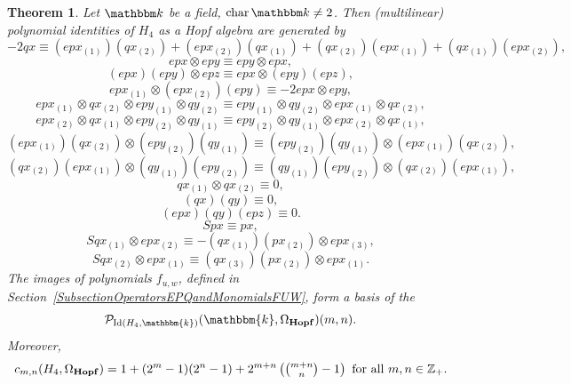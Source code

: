 \documentclass[12pt, reqno, a4paper]{amsart}
\theoremstyle{plain}
\newtheorem{theorem}{Theorem}[section]
\theoremstyle{remark}
\theoremstyle{definition}
\numberwithin{equation}{section}
\DeclareMathOperator{\Id}{Id}
\DeclareMathOperator{\ch}{char}
\begin{document}
\begin{theorem} Let $\mathbbm k$ be a field, $\ch \mathbbm k \ne 2$. Then (multilinear) polynomial identities of $H_4$ as a Hopf algebra are generated by
\begin{equation}\label{EqSweedlerIdFirst}
-2qx \equiv (epx_{(1)})(qx_{(2)})+(epx_{(2)})(qx_{(1)})+(qx_{(2)})(epx_{(1)})+(qx_{(1)})(epx_{(2)}),
\end{equation}
\begin{equation}\label{EqSweedlerIdRearrangeFirst}epx\otimes epy \equiv epy \otimes epx,
\end{equation}
\begin{equation}(epx)(epy)\otimes epz \equiv epx \otimes (epy)(epz),
\end{equation}
\begin{equation}epx_{(1)}\otimes (epx_{(2)})(epy) \equiv -2 epx \otimes epy,
\end{equation}
\begin{equation} epx_{(1)} \otimes qx_{(2)} \otimes epy_{(1)} \otimes qy_{(2)}
\equiv epy_{(1)} \otimes qy_{(2)} \otimes epx_{(1)} \otimes qx_{(2)},
\end{equation}
\begin{equation} epx_{(2)} \otimes qx_{(1)} \otimes epy_{(2)} \otimes qy_{(1)}
\equiv epy_{(2)} \otimes qy_{(1)} \otimes epx_{(2)} \otimes qx_{(1)},
\end{equation}
\begin{equation} (epx_{(1)}) (qx_{(2)}) \otimes (epy_{(2)}) (qy_{(1)})
\equiv (epy_{(2)}) (qy_{(1)}) \otimes (epx_{(1)}) (qx_{(2)}),
\end{equation}
\begin{equation}\label{EqSweedlerIdRearrangeLast}  (qx_{(2)}) (epx_{(1)}) \otimes  (qy_{(1)}) (epy_{(2)})
\equiv  (qy_{(1)}) (epy_{(2)})\otimes  (qx_{(2)}) (epx_{(1)}),
\end{equation}
\begin{equation}\label{EqSweedlerIdZeroDoubleQFirst}qx_{(1)}\otimes qx_{(2)} \equiv 0,
\end{equation}
\begin{equation}(qx)(qy) \equiv 0,
\end{equation}
\begin{equation}\label{EqSweedlerIdZeroDoubleEPFromDifferentSidesOfQ}(epx)(qy)(epz) \equiv 0.
\end{equation}
\begin{equation}Spx \equiv px,
\end{equation}
\begin{equation}Sqx_{(1)} \otimes epx_{(2)} \equiv -(qx_{(1)})(px_{(2)}) \otimes epx_{(3)},
\end{equation}
\begin{equation}\label{EqSweedlerIdLast}Sqx_{(2)} \otimes epx_{(1)} \equiv (qx_{(3)})(px_{(2)}) \otimes epx_{(1)}.
\end{equation}
The images of polynomials $f_{u,w}$, defined in Section~\ref{SubsectionOperatorsEPQandMonomialsFUW}, form a basis of the $$\mathcal P_{\Id(H_4, \mathbbm{k})}(\mathbbm{k}, \Omega_\mathbf{Hopf})(m,n).$$
Moreover, $$c_{m,n}(H_4,\Omega_\mathbf{Hopf})= 1 + (2^m-1)(2^n-1) + 2^{m+n} \left(\tbinom{m+n}{n}-1\right)
\text{ for all }m, n\in\mathbb Z_+.$$
\end{theorem}
\end{document}
